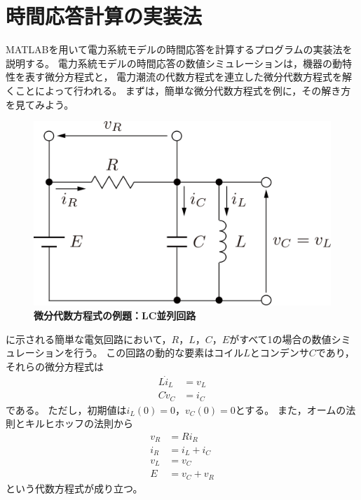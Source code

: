 \documentclass[tombow,dvipdfmx]{corona-a5-1.1}
\begin{document}
\section{時間応答計算の実装法}
{
MATLABを用いて電力系統モデルの時間応答を計算するプログラムの実装法を説明する。
電力系統モデルの時間応答の数値シミュレーションは，機器の動特性を表す微分方程式と，
電力潮流の代数方程式を連立した微分代数方程式を解くことによって行われる。
まずは，簡単な微分代数方程式を例に，その解き方を見てみよう。

\begin{例}[簡単な微分代数方程式の数値解法]\label{ex:dae_ex1}
\begin{figure}[t]
  \centering
  \includegraphics[width = .5\linewidth]{figs/circkawaguchi}
  \medskip
  \caption{\textbf{微分代数方程式の例題：LC並列回路}}
  \label{fig:RLC}
  \medskip
\end{figure}

に示される簡単な電気回路において，$R$，$L$，$C$，$E$がすべて1の場合の数値シミュレーションを行う。
この回路の動的な要素はコイル$L$とコンデンサ$C$であり，それらの微分方程式は
\begin{subequations}\label{eq:ex_de}
  \begin{align}
    L\dot i_L & = v_L \\
    C\dot v_C & = i_C
  \end{align}
\end{subequations}
である。
ただし，初期値は$i_L(0)=0$，$v_C(0)=0$とする。
また，オームの法則とキルヒホッフの法則から
\begin{subequations}\label{eq:ex_ae}
  \begin{align}
    v_R & =R i_R      \\
    i_R & = i_L + i_C \\
    v_L & = v_C       \\
    E   & = v_C + v_R
  \end{align}
\end{subequations}
という代数方程式が成り立つ。



\end{例}}
\end{document}
